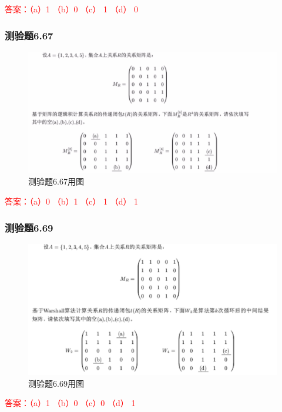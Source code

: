 \documentclass[UTF8, heading=true]{ctexart}
\begin{document}
\textcolor{red}{答案：（a）1 （b）0 （c） 1 （d） 0}

\subsubsection{测验题6.67}
\begin{figure}[htbp]
    \centering
    \includegraphics[width=1\textwidth]{6.67.jpg} %
    \caption{测验题6.67用图}
\end{figure}

\textcolor{red}{答案：（a）0 （b）1 （c） 1 （d） 1}

\subsubsection{测验题6.69}

\begin{figure}[htbp]
  \centering
  \includegraphics[width=1\textwidth]{6.69.jpg} %
  \caption{测验题6.69用图}
\end{figure}

\textcolor{red}{答案：（a）1 （b）0 （c）0 （d） 1}
\end{document}
